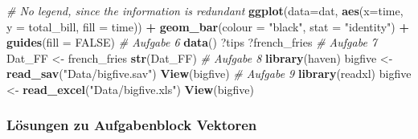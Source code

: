 \documentclass[]{article}
\newenvironment{Shaded}{\begin{snugshade}}{\end{snugshade}}
\newcommand{\KeywordTok}[1]{\textcolor[rgb]{0.13,0.29,0.53}{\textbf{#1}}}
\newcommand{\DataTypeTok}[1]{\textcolor[rgb]{0.13,0.29,0.53}{#1}}
\newcommand{\StringTok}[1]{\textcolor[rgb]{0.31,0.60,0.02}{#1}}
\newcommand{\CommentTok}[1]{\textcolor[rgb]{0.56,0.35,0.01}{\textit{#1}}}
\newcommand{\OtherTok}[1]{\textcolor[rgb]{0.56,0.35,0.01}{#1}}
\newcommand{\OperatorTok}[1]{\textcolor[rgb]{0.81,0.36,0.00}{\textbf{#1}}}
\newcommand{\NormalTok}[1]{#1}
\begin{document}
\begin{Shaded}
\begin{Highlighting}[]
    \CommentTok{# No legend, since the information is redundant}
    \KeywordTok{ggplot}\NormalTok{(}\DataTypeTok{data=}\NormalTok{dat, }\KeywordTok{aes}\NormalTok{(}\DataTypeTok{x=}\NormalTok{time, }\DataTypeTok{y =}\NormalTok{ total_bill, }\DataTypeTok{fill =}\NormalTok{ time)) }\OperatorTok{+}
\StringTok{      }\KeywordTok{geom_bar}\NormalTok{(}\DataTypeTok{colour =} \StringTok{"black"}\NormalTok{, }\DataTypeTok{stat =} \StringTok{"identity"}\NormalTok{) }\OperatorTok{+}
\StringTok{      }\KeywordTok{guides}\NormalTok{(}\DataTypeTok{fill =} \OtherTok{FALSE}\NormalTok{)}
  \CommentTok{# Aufgabe 6}
    \KeywordTok{data}\NormalTok{()}
\NormalTok{    ?tips}
\NormalTok{    ?french_fries}
  \CommentTok{# Aufgabe 7}
\NormalTok{    Dat_FF <-}\StringTok{ }\NormalTok{french_fries}
    \KeywordTok{str}\NormalTok{(Dat_FF)}
  \CommentTok{# Aufgabe 8}
    \KeywordTok{library}\NormalTok{(haven)}
\NormalTok{    bigfive <-}\StringTok{ }\KeywordTok{read_sav}\NormalTok{(}\StringTok{"Data/bigfive.sav"}\NormalTok{)}
    \KeywordTok{View}\NormalTok{(bigfive)}
  \CommentTok{# Aufgabe 9}
    \KeywordTok{library}\NormalTok{(readxl)}
\NormalTok{    bigfive <-}\StringTok{ }\KeywordTok{read_excel}\NormalTok{(}\StringTok{"Data/bigfive.xls"}\NormalTok{)}
    \KeywordTok{View}\NormalTok{(bigfive)}
\end{Highlighting}
\end{Shaded}

\subsubsection*{Lösungen zu Aufgabenblock
Vektoren}\label{losungen-zu-aufgabenblock-vektoren}
\end{document}
